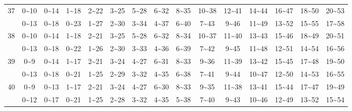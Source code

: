 \documentclass[lang=cn,10pt]{elegantbook}
\begin{document}
\begin{longtable}{c|cccccccccccccc}
    37 & 0\textasciitilde10 & 0\textasciitilde14 & 1\textasciitilde18 & 2\textasciitilde22 & 3\textasciitilde25 & 5\textasciitilde28 & 6\textasciitilde32 & 8\textasciitilde35 & 10\textasciitilde38 & 12\textasciitilde41 & 14\textasciitilde44 & 16\textasciitilde47 & 18\textasciitilde50 & 20\textasciitilde53 \\
       & 0\textasciitilde13 & 0\textasciitilde18 & 0\textasciitilde23 & 1\textasciitilde27 & 2\textasciitilde30 & 3\textasciitilde34 & 4\textasciitilde37 & 6\textasciitilde40 & 7\textasciitilde43 & 9\textasciitilde46 & 11\textasciitilde49 & 13\textasciitilde52 & 15\textasciitilde55 & 17\textasciitilde58 \\
    38 & 0\textasciitilde10 & 0\textasciitilde14 & 1\textasciitilde18 & 2\textasciitilde21 & 3\textasciitilde25 & 5\textasciitilde28 & 6\textasciitilde32 & 8\textasciitilde34 & 10\textasciitilde37 & 11\textasciitilde40 & 13\textasciitilde43 & 15\textasciitilde46 & 18\textasciitilde49 & 20\textasciitilde51 \\
       & 0\textasciitilde13 & 0\textasciitilde18 & 0\textasciitilde22 & 1\textasciitilde26 & 2\textasciitilde30 & 3\textasciitilde33 & 4\textasciitilde36 & 6\textasciitilde39 & 7\textasciitilde42 & 9\textasciitilde45 & 11\textasciitilde48 & 12\textasciitilde51 & 14\textasciitilde54 & 16\textasciitilde56 \\
    39 & 0\textasciitilde9 & 0\textasciitilde14 & 1\textasciitilde17 & 2\textasciitilde21 & 3\textasciitilde24 & 4\textasciitilde27 & 6\textasciitilde31 & 8\textasciitilde33 & 9\textasciitilde36 & 11\textasciitilde39 & 13\textasciitilde42 & 15\textasciitilde45 & 17\textasciitilde48 & 19\textasciitilde50 \\
       & 0\textasciitilde13 & 0\textasciitilde18 & 0\textasciitilde21 & 1\textasciitilde25 & 2\textasciitilde29 & 3\textasciitilde32 & 4\textasciitilde35 & 6\textasciitilde38 & 7\textasciitilde41 & 9\textasciitilde44 & 10\textasciitilde47 & 12\textasciitilde50 & 14\textasciitilde53 & 16\textasciitilde55 \\
    40 & 0\textasciitilde9 & 0\textasciitilde13 & 1\textasciitilde17 & 2\textasciitilde21 & 3\textasciitilde24 & 4\textasciitilde27 & 6\textasciitilde30 & 8\textasciitilde33 & 9\textasciitilde35 & 11\textasciitilde38 & 13\textasciitilde41 & 15\textasciitilde44 & 17\textasciitilde47 & 19\textasciitilde49 \\
       & 0\textasciitilde12 & 0\textasciitilde17 & 0\textasciitilde21 & 1\textasciitilde25 & 2\textasciitilde28 & 3\textasciitilde32 & 4\textasciitilde35 & 5\textasciitilde38 & 7\textasciitilde40 & 9\textasciitilde43 & 10\textasciitilde46 & 12\textasciitilde49 & 13\textasciitilde52 & 15\textasciitilde54 \\

\end{longtable}
\end{document}
